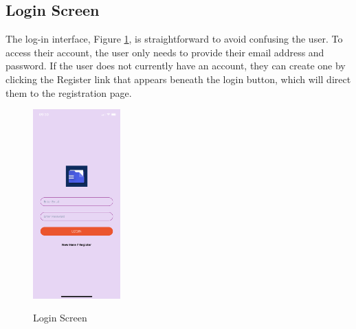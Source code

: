 \subsection{Login Screen}
The log-in interface, Figure \ref{image:login}, is straightforward to avoid confusing the user. To access their account, the user only needs to provide their email address and password. If the user does not currently have an account, they can create one by clicking the Register link that appears beneath the login button, which will direct them to the registration page. 
\begin{figure}[h!]
    \includegraphics[width=0.3\textwidth]
    {images/Login.png}
    \centering
    \label{image:login}
    \caption{Login Screen}
\end{figure}

